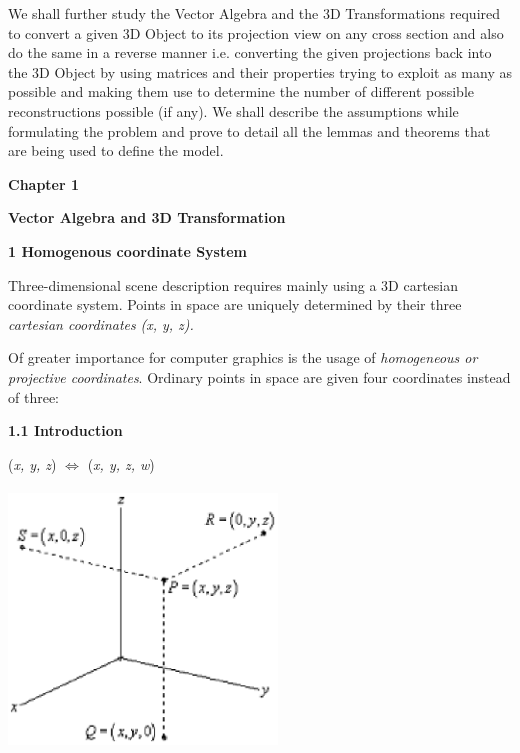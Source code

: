 \documentclass{article} %
\begin{document}
\noindent 

\noindent We shall further study the Vector Algebra and the 3D Transformations required to convert a given 3D Object to its projection view on any cross section and also do the same in a reverse manner i.e. converting the given projections back into the 3D Object by using matrices and their properties trying to exploit as many as possible and making them use to determine the number of different possible reconstructions possible (if any). We shall describe the assumptions while formulating the problem and prove to detail all the lemmas and theorems that are being used to define the model.

\noindent 

\noindent 

\noindent 

\noindent \textbf{Chapter 1}

\noindent \textbf{Vector Algebra and 3D Transformation}

\noindent \textbf{}

\noindent \textbf{1    Homogenous coordinate System}

\noindent Three-dimensional scene description requires mainly using a 3D cartesian coordinate system. Points in space are uniquely determined by their three \textit{cartesian coordinates} \textit{(x, y, z).}

\noindent Of greater importance for computer graphics is the usage of \textit{homogeneous or projective coordinates}. Ordinary points in space are given four coordinates instead of three:

\noindent \textbf{1.1 Introduction}

                   (\textit{x, y, z})\textit{ }$\mathrm{\Leftrightarrow }$\textbf{ }(\textit{x, y, z, w})\textit{  }

\noindent \includegraphics*[width=2.81in, height=2.72in, keepaspectratio=false]{image6}
\end{document}
